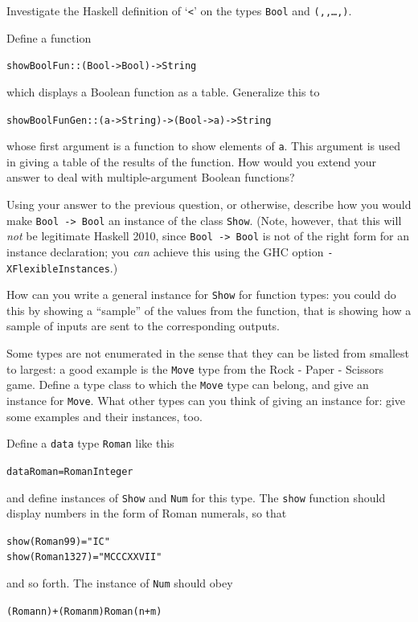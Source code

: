 \begin{exercises}
 

\item
Investigate the Haskell definition of `\texttt{<}' on the types \texttt{Bool} and
\texttt{(\tone,\ttwo,\ldots,)}.

\item
Define a function
\begin{alltt}
showBoolFun :: (Bool -> Bool) -> String
\end{alltt}
which displays a Boolean function as a table. Generalize this to
\begin{alltt}
showBoolFunGen :: (a -> String) -> (Bool -> a) -> String
\end{alltt}
whose first argument is a
function to show elements of \texttt{a}. This argument is used in giving a table
of the results of the function. How would you extend your answer to deal
with multiple-argument Boolean functions?

\item
Using your answer to the previous question, or otherwise, describe how
you would make \texttt{Bool -> Bool} an instance of the class
\texttt{Show}. (Note, however, that this will {\em not\/} be legitimate Haskell 2010,
since \texttt{Bool -> Bool} is not of the right form for an instance
declaration; you \emph{can} achieve this using the GHC option \texttt{-XFlexibleInstances}.)

\item
How can you write a general instance for \texttt{Show} for function types: you could do this by showing a ``sample'' of the values from the function, that is showing how a sample of inputs are sent to the corresponding outputs.

\item
Some types are not enumerated in the sense that they can be listed from smallest to largest: a good example is the \texttt{Move} type from the Rock - Paper - Scissors game. Define a type class to which the \texttt{Move} type can belong, and give an instance for \texttt{Move}. What other types can you think of giving an instance for: give some examples and their instances, too.

\item
Define a \texttt{data} type \texttt{Roman} like this
\begin{alltt}
data Roman = Roman Integer
\end{alltt}
and define instances of \texttt{Show} and \texttt{Num} for this type. The \texttt{show} function should display numbers in the form of Roman numerals, so that
\begin{alltt}
show (Roman 99) = "IC"
show (Roman 1327) = "MCCCXXVII"
\end{alltt}
and so forth. The instance of \texttt{Num} should obey
\begin{alltt}
(Roman n) + (Roman m) \step{} Roman (n+m)
\end{alltt}


\end{exercises}
